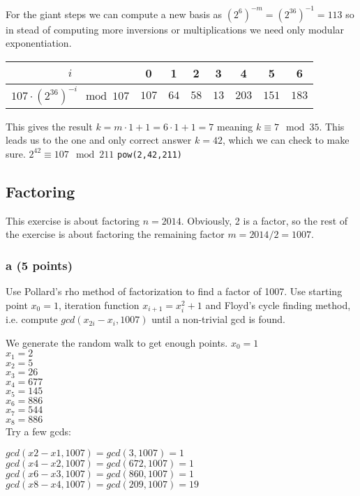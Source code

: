 \documentclass{article}
\begin{document}
For the giant steps we can compute a new basis as $(2^6)^{-m} = (2^{36})^{-1} =
113$
so in stead of computing more inversions or multiplications we need only modular exponentiation.

\begin{tabular}{|c|c|c|c|c|c|c|c|}
\hline
$i $ & 0 & 1 & 2 & 3 & 4 & 5 & 6  \\
\hline
$107 \cdot (2^{36})^{-i} \mod 107$ & $107$ & $64$ & $58$ & $13$ & $203$ & $151$ & $183$ \\
\hline
\end{tabular}

This gives the result $k=m \cdot 1 + 1 = 6 \cdot 1 + 1 = 7$ meaning $k \equiv 7
\mod 35$.
This leads us to the one and only correct answer $k=42$, which we can check to
make sure.
$2^{42} \equiv 107 \mod 211$
\verb|pow(2,42,211)|

\subsection{Factoring}
This exercise is about factoring $n = 2014$. Obviously, 2 is a factor, so
the rest of the exercise is about factoring the remaining factor $m = 2014/2 =
1007$.

\subsubsection{a (5 points)}
Use Pollard’s rho method of factorization to find a factor of 1007.
Use starting point $x_0 = 1$, iteration function $x_{i+1} = x_i^2 + 1$ and
Floyd's cycle finding method, i.e. compute $gcd(x_{2i} - x_i , 1007)$ until
a non-trivial gcd is found.

We generate the random walk to get enough points.
$x_0 = 1$ \\
$x_1 = 2$ \\
$x_2 = 5$ \\
$x_3 = 26$ \\
$x_4 = 677$ \\
$x_5 = 145$ \\
$x_6 = 886$ \\
$x_7 = 544$ \\
$x_8 = 886$ \\

Try a few gcds:

$gcd(x2-x1, 1007) = gcd(3,   1007) = 1$ \\
$gcd(x4-x2, 1007) = gcd(672, 1007) = 1$ \\
$gcd(x6-x3, 1007) = gcd(860, 1007) = 1$ \\
$gcd(x8-x4, 1007) = gcd(209, 1007) = 19$
\end{document}
